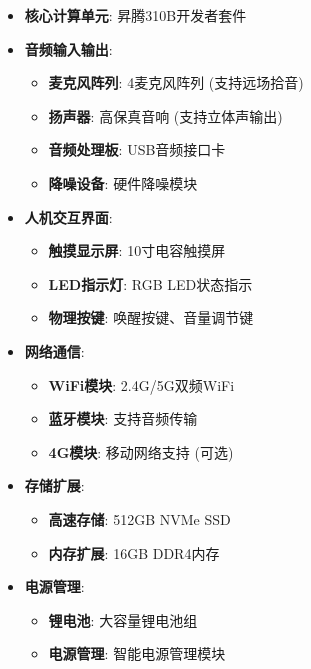 \begin{itemize}
\tightlist
\item
  \textbf{核心计算单元}: 昇腾310B开发者套件
\item
  \textbf{音频输入输出}:

  \begin{itemize}
  \tightlist
  \item
    \textbf{麦克风阵列}: 4麦克风阵列 (支持远场拾音)
  \item
    \textbf{扬声器}: 高保真音响 (支持立体声输出)
  \item
    \textbf{音频处理板}: USB音频接口卡
  \item
    \textbf{降噪设备}: 硬件降噪模块
  \end{itemize}
\item
  \textbf{人机交互界面}:

  \begin{itemize}
  \tightlist
  \item
    \textbf{触摸显示屏}: 10寸电容触摸屏
  \item
    \textbf{LED指示灯}: RGB LED状态指示
  \item
    \textbf{物理按键}: 唤醒按键、音量调节键
  \end{itemize}
\item
  \textbf{网络通信}:

  \begin{itemize}
  \tightlist
  \item
    \textbf{WiFi模块}: 2.4G/5G双频WiFi
  \item
    \textbf{蓝牙模块}: 支持音频传输
  \item
    \textbf{4G模块}: 移动网络支持 (可选)
  \end{itemize}
\item
  \textbf{存储扩展}:

  \begin{itemize}
  \tightlist
  \item
    \textbf{高速存储}: 512GB NVMe SSD
  \item
    \textbf{内存扩展}: 16GB DDR4内存
  \end{itemize}
\item
  \textbf{电源管理}:

  \begin{itemize}
  \tightlist
  \item
    \textbf{锂电池}: 大容量锂电池组
  \item
    \textbf{电源管理}: 智能电源管理模块
  \end{itemize}
\end{itemize}

